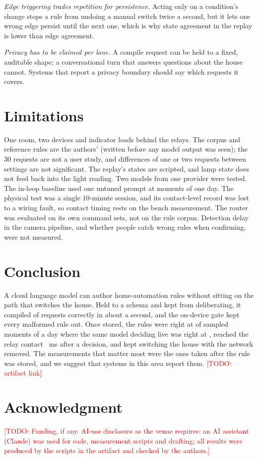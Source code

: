 \documentclass[conference]{IEEEtran}
\newcommand{\todo}[1]{\textcolor{red}{[TODO: #1]}}
\begin{document}
\textit{Edge triggering trades repetition for persistence.} Acting only on a
condition's change stops a rule from undoing a manual switch twice a second,
but it lets one wrong edge persist until the next one, which is why state
agreement in the replay is lower than edge agreement.

\textit{Privacy has to be claimed per lane.} A compile request can be held to a
fixed, auditable shape; a conversational turn that answers questions about the
house cannot. Systems that report a privacy boundary should say which requests
it covers.

\section{Limitations}\label{sec:limits}
One room, two devices and indicator loads behind the relays. The corpus and
reference rules are the authors' (written before any model output was seen);
the 30 requests are not a user study, and differences of one or two requests
between settings are not significant. The
replay's states are scripted, and lamp state does not feed back into the light
reading. Two models from one provider were tested. The in-loop baseline
used one untuned prompt at \blN{} moments of one day. The physical test
was a single 10-minute session, and its contact-level record was lost to a
wiring fault, so contact timing rests on the bench measurement. The router was
evaluated on its own command sets, not on the rule corpus. Detection delay in
the camera pipeline, and whether people catch wrong rules when confirming, were
not measured.

\section{Conclusion}\label{sec:conclusion}
A cloud language model can author home-automation rules without sitting on the
path that switches the house. Held to a schema and kept from deliberating, it
compiled \synDepTrialCorrect{} of \synDepTrialN{} requests correctly in about a
second, and the on-device gate kept every malformed rule out. Once stored, the
rules were right at \momRules{} of \blN{} sampled moments of a day where the
same model deciding live was right at \blCorrect{}, reached the relay contact
\relayOnMed~ms after a decision, and kept switching the house with the network
removed. The measurements that matter most were the ones taken after the rule
was stored, and we suggest that systems in this area report them. \todo{artifact link}

\section*{Acknowledgment}
\todo{Funding, if any. AI-use disclosure as the venue requires: an AI assistant
(Claude) was used for code, measurement scripts and drafting; all results were
produced by the scripts in the artifact and checked by the authors.}



\end{document}
